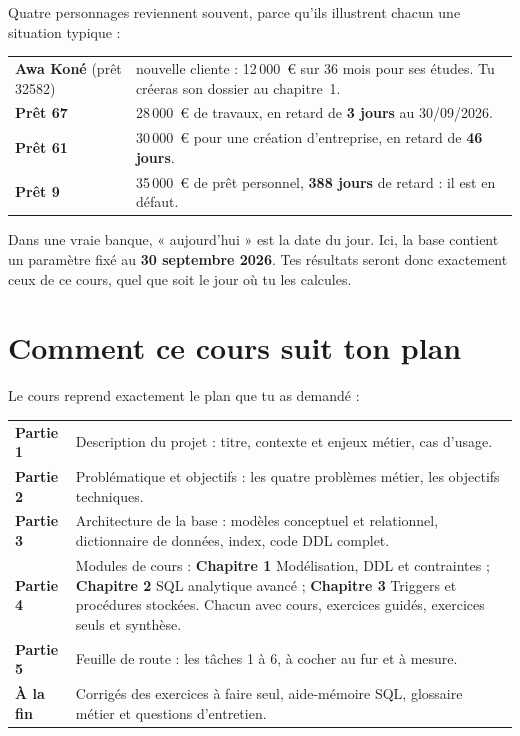 Quatre personnages reviennent souvent, parce qu'ils illustrent chacun une situation typique :

\begin{center}\small
\begin{tabularx}{\linewidth}{@{}l L@{}}
\toprule
\textbf{Awa Koné} (prêt 32582) & nouvelle cliente : 12\,000~€ sur 36 mois pour ses études. Tu créeras
son dossier au chapitre~1. \\
\textbf{Prêt 67} & 28\,000~€ de travaux, en retard de \textbf{3 jours} au 30/09/2026. \\
\textbf{Prêt 61} & 30\,000~€ pour une création d'entreprise, en retard de \textbf{46 jours}. \\
\textbf{Prêt 9} & 35\,000~€ de prêt personnel, \textbf{388 jours} de retard : il est en défaut. \\
\bottomrule
\end{tabularx}
\end{center}

\begin{observation}
Dans une vraie banque, « aujourd'hui » est la date du jour. Ici, la base contient un paramètre
 fixé au \textbf{30 septembre 2026}. Tes résultats seront donc exactement ceux
de ce cours, quel que soit le jour où tu les calcules.
\end{observation}

\section*{Comment ce cours suit ton plan}

Le cours reprend exactement le plan que tu as demandé :

\begin{center}\small
\begin{tabularx}{\linewidth}{@{}l L@{}}
\toprule
\textbf{Partie 1} & Description du projet : titre, contexte et enjeux métier, cas d'usage. \\
\textbf{Partie 2} & Problématique et objectifs : les quatre problèmes métier, les objectifs techniques. \\
\textbf{Partie 3} & Architecture de la base : modèles conceptuel et relationnel, dictionnaire de
données, index, code DDL complet. \\
\textbf{Partie 4} & Modules de cours : \textbf{Chapitre 1} Modélisation, DDL et contraintes ;
\textbf{Chapitre 2} SQL analytique avancé ; \textbf{Chapitre 3} Triggers et procédures stockées.
Chacun avec cours, exercices guidés, exercices seuls et synthèse. \\
\textbf{Partie 5} & Feuille de route : les tâches 1 à 6, à cocher au fur et à mesure. \\
\textbf{À la fin} & Corrigés des exercices à faire seul, aide-mémoire SQL, glossaire métier et questions
d'entretien. \\
\bottomrule
\end{tabularx}
\end{center}


